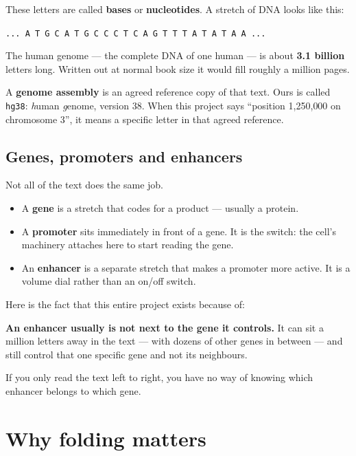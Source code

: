 \documentclass[11pt,a4paper]{article}
\newcommand{\term}[1]{\textcolor{deepblue}{\textbf{#1}}}
\newcommand{\code}[1]{\texttt{\small #1}}
\begin{document}
These letters are called \term{bases} or \term{nucleotides}. A stretch of DNA
looks like this:

\begin{center}
\code{... A T G C A T G C C C T C A G T T T A T A T A A ...}
\end{center}

The human genome --- the complete DNA of one human --- is about
\textbf{3.1 billion} letters long. Written out at normal book size it would fill
roughly a million pages.

A \term{genome assembly} is an agreed reference copy of that text. Ours is called
\code{hg38}: \emph{h}uman \emph{g}enome, version 38. When this project says
``position 1{,}250{,}000 on chromosome 3'', it means a specific letter in that
agreed reference.

\subsection{Genes, promoters and enhancers}

Not all of the text does the same job.

\begin{itemize}
\item A \term{gene} is a stretch that codes for a product --- usually a protein.
\item A \term{promoter} sits immediately in front of a gene. It is the switch: the
      cell's machinery attaches here to start reading the gene.
\item An \term{enhancer} is a separate stretch that makes a promoter more active.
      It is a volume dial rather than an on/off switch.
\end{itemize}

Here is the fact that this entire project exists because of:

\begin{plainbox}
\textbf{An enhancer usually is not next to the gene it controls.} It can sit a
million letters away in the text --- with dozens of other genes in between ---
and still control that one specific gene and not its neighbours.

If you only read the text left to right, you have no way of knowing which
enhancer belongs to which gene.
\end{plainbox}

\section{Why folding matters}
\end{document}
